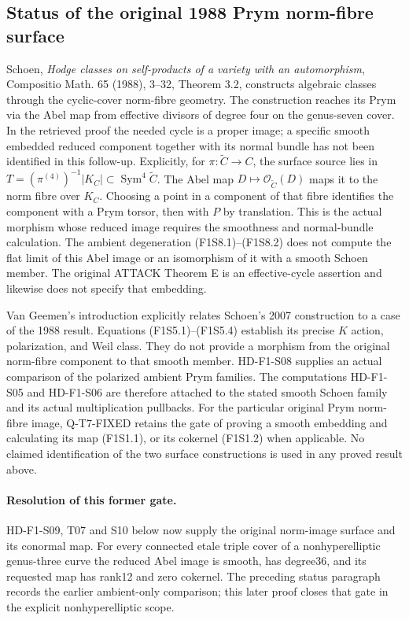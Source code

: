 \subsection{Status of the original 1988 Prym norm-fibre surface}

Schoen, \emph{Hodge classes on self-products of a variety with an
automorphism}, Compositio Math. 65 (1988), 3--32, Theorem 3.2,
constructs algebraic classes through the cyclic-cover norm-fibre
geometry. The construction reaches its Prym via the Abel map
from effective divisors of degree four on the genus-seven cover.
In the retrieved proof the needed cycle is a proper image; a
specific smooth embedded reduced component together with its
normal bundle has not been identified in this follow-up.
Explicitly, for $\pi:\widetilde C\to C$, the surface source
lies in
$T=(\pi^{(4)})^{-1}|K_C|\subset\operatorname{Sym}^4\widetilde C$.
The Abel map $D\mapsto\mathcal O_{\widetilde C}(D)$ maps it
to the norm fibre over $K_C$. Choosing a point in a component
of that fibre identifies the component with a Prym torsor,
then with $P$ by translation. This is the actual morphism
whose reduced image requires the smoothness and normal-bundle
calculation. The ambient degeneration (F1S8.1)--(F1S8.2)
does not compute the flat limit of this Abel image or an
isomorphism of it with a smooth Schoen member.
The original ATTACK Theorem E is an effective-cycle assertion
and likewise does not specify that embedding.

Van Geemen's introduction explicitly relates Schoen's 2007
construction to a case of the 1988 result. Equations
(F1S5.1)--(F1S5.4) establish its precise $K$ action, polarization,
and Weil class. They do not provide a morphism from the original
norm-fibre component to that smooth member. HD-F1-S08 supplies
an actual comparison of the polarized ambient Prym families.
The computations
HD-F1-S05 and HD-F1-S06 are therefore attached to the stated
smooth Schoen family and its actual multiplication pullbacks.
For the particular original Prym norm-fibre image, Q-T7-FIXED
retains the gate of proving a smooth embedding and calculating
its map (F1S1.1), or its cokernel (F1S1.2) when applicable.
No claimed identification of the two surface constructions is
used in any proved result above.

\paragraph{Resolution of this former gate.}
HD-F1-S09, T07 and S10 below now supply the original norm-image
surface and its conormal map. For every connected etale triple cover
of a nonhyperelliptic genus-three curve the reduced Abel image is
smooth, has degree36, and its requested map has rank12 and zero
cokernel. The preceding status paragraph records the earlier
ambient-only comparison; this later proof closes that gate in the
explicit nonhyperelliptic scope.
